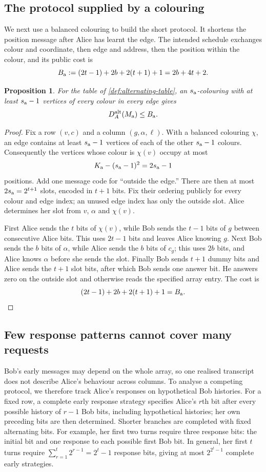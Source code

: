 \documentclass[11pt]{article} \usepackage[utf8]{inputenc}
\theoremstyle{plain} \newtheorem{theorem}{Theorem}[section]
\newtheorem{proposition}[proposition]{Proposition}
\theoremstyle{definition} \newaliascnt{definition}{theorem}
\begin{document}
\subsection{The protocol supplied by a colouring}

We next use a balanced colouring to build the short protocol. It shortens the
position message after Alice has learnt the edge. The intended schedule
exchanges colour and coordinate, then edge and address, then the position within
the colour, and its public cost is
\[
B_{\rm a}:=(2t-1)+2b+2(t+1)+1=2b+4t+2.
\]

\begin{proposition}\label{prop:alternating-upper}
For the table of \cref{def:alternating-table}, an $s_{\rm a}$-colouring with at
least $s_{\rm a}-1$ vertices of every colour in every edge gives
\[
D_A^{\rm alt}(M_{\rm a})\le B_{\rm a}.
\]
\end{proposition}
\begin{proof}
Fix a row $(v,c)$ and a column $(g,\alpha,\ell)$. With a balanced colouring
$\chi$, an edge contains at least
$s_{\rm a}-1$ vertices of each of the other $s_{\rm a}-1$ colours. Consequently
the vertices whose colour is $\chi(v)$ occupy at most
\[
K_{\rm a}-(s_{\rm a}-1)^2=2s_{\rm a}-1
\]
positions.
Add one message code for ``outside the edge.'' There are then at most
$2s_{\rm a}=2^{t+1}$ slots, encoded in $t+1$ bits. Fix their ordering publicly
for every colour and edge index; an unused edge index has only the outside
slot. Alice determines her slot from $v$, $\alpha$ and $\chi(v)$.

First Alice sends the $t$ bits of $\chi(v)$, while Bob sends
the $t-1$ bits of $g$ between consecutive Alice bits. This uses $2t-1$ bits and
leaves Alice knowing $g$. Next Bob sends the $b$ bits of $\alpha$, while Alice
sends the $b$ bits of $c_g$; this uses $2b$ bits, and Alice knows $\alpha$
before she sends the slot. Finally Bob sends $t+1$ dummy bits and Alice sends
the $t+1$ slot bits, after which Bob sends one answer bit. He answers zero on
the outside slot and otherwise reads the specified array entry. The cost is
\[
(2t-1)+2b+2(t+1)+1=B_{\rm a}.
\]
\end{proof}

\subsection{Few response patterns cannot cover many requests}

Bob's early messages may depend on the whole array, so one realised transcript
does not describe Alice's behaviour across columns. To analyse a competing
protocol, we therefore track Alice's responses on hypothetical Bob histories.
For a fixed row, a complete early response strategy specifies Alice's $r$th bit
after every possible history of $r-1$ Bob bits, including hypothetical
histories; her own preceding bits are then determined. Shorter branches are
completed with fixed alternating bits. For example, her first
two turns require three response bits: the initial bit and one response to each
possible first Bob bit.
In general, her first $t$ turns require
$\sum_{r=1}^t2^{r-1}=2^t-1$ response bits, giving at most
$2^{2^t-1}$ complete early strategies.
\end{document}
